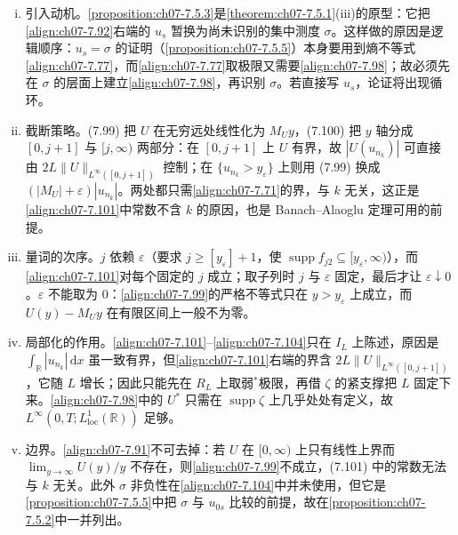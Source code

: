 \documentclass[../../main.tex]{subfiles}%
\begin{document}
\begin{remark}\label{remark:ch07-7.5.3动机}
\begin{enumerate}[(i)]
\item 引入动机。\cref{proposition:ch07-7.5.3}是\cref{theorem:ch07-7.5.1}(iii)的原型：它把\eqref{align:ch07-7.92}右端的 $u_s$ 暂换为尚未识别的集中测度 $\sigma$。这样做的原因是逻辑顺序：$u_s=\sigma$ 的证明（\cref{proposition:ch07-7.5.5}）本身要用到熵不等式\eqref{align:ch07-7.77}，而\eqref{align:ch07-7.77}取极限又需要\eqref{align:ch07-7.98}；故必须先在 $\sigma$ 的层面上建立\eqref{align:ch07-7.98}，再识别 $\sigma$。若直接写 $u_s$，论证将出现循环。
\item 截断策略。(7.99) 把 $U$ 在无穷远处线性化为 $M_Uy$，(7.100) 把 $y$ 轴分成 $[0,j+1]$ 与 $[j,\infty)$ 两部分：在 $[0,j+1]$ 上 $U$ 有界，故 $|U(u_{n_k})|$ 可直接由 $2L\|U\|_{L^\infty([0,j+1])}$ 控制；在 $\{u_{n_k}>y_\varepsilon\}$ 上则用 (7.99) 换成 $(|M_U|+\varepsilon)|u_{n_k}|$。两处都只需\eqref{align:ch07-7.71}的界，与 $k$ 无关，这正是\eqref{align:ch07-7.101}中常数不含 $k$ 的原因，也是 Banach--Alaoglu 定理可用的前提。
\item 量词的次序。$j$ 依赖 $\varepsilon$（要求 $j\geqslant[y_\varepsilon]+1$，使 $\operatorname{supp}f_{j2}\subseteq[y_\varepsilon,\infty)$），而\eqref{align:ch07-7.101}对每个固定的 $j$ 成立；取子列时 $j$ 与 $\varepsilon$ 固定，最后才让 $\varepsilon\downarrow0$。$\varepsilon$ 不能取为 $0$：\eqref{align:ch07-7.99}的严格不等式只在 $y>y_\varepsilon$ 上成立，而 $U(y)-M_Uy$ 在有限区间上一般不为零。
\item 局部化的作用。\eqref{align:ch07-7.101}--\eqref{align:ch07-7.104}只在 $I_L$ 上陈述，原因是 $\int_{\mathbb{R}}|u_{n_k}|\,\mathrm{d}x$ 虽一致有界，但\eqref{align:ch07-7.101}右端的界含 $2L\|U\|_{L^\infty([0,j+1])}$，它随 $L$ 增长；因此只能先在 $R_L$ 上取弱$^*$极限，再借 $\zeta$ 的紧支撑把 $L$ 固定下来。\eqref{align:ch07-7.98}中的 $U^*$ 只需在 $\operatorname{supp}\zeta$ 上几乎处处有定义，故 $L^\infty(0,T;L^1_{\mathrm{loc}}(\mathbb{R}))$ 足够。
\item 边界。\eqref{align:ch07-7.91}不可去掉：若 $U$ 在 $[0,\infty)$ 上只有线性上界而 $\lim_{y\to\infty}U(y)/y$ 不存在，则\eqref{align:ch07-7.99}不成立，(7.101) 中的常数无法与 $k$ 无关。此外 $\sigma$ 非负性在\eqref{align:ch07-7.104}中并未使用，但它是\cref{proposition:ch07-7.5.5}中把 $\sigma$ 与 $u_{0s}$ 比较的前提，故在\cref{proposition:ch07-7.5.2}中一并列出。
\end{enumerate}
\end{remark}
\end{document}
